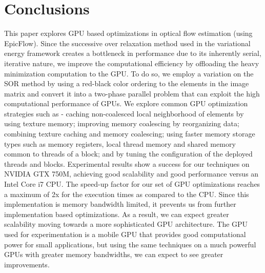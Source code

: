 \documentclass[english]{article}
\begin{document}
	\section{Conclusions}
	This paper explores GPU based optimizations in optical flow estimation (using EpicFlow). Since the successive over relaxation method used in the variational energy framework creates a bottleneck in performance due to its inherently serial, iterative nature, we improve the computational efficiency by offloading the heavy minimization computation to the GPU. To do so, we employ a variation on the SOR method by using a red-black color ordering to the elements in the image matrix and convert it into a two-phase parallel problem that can exploit the high computational performance of GPUs. We explore common GPU optimization strategies such as - caching non-coalesced local neighborhood of elements by using texture memory; improving memory coalescing by reorganizing data; combining texture caching and memory coalescing; using faster memory storage types such as memory registers, local thread memory and shared memory common to threads of a block; and by tuning the configuration of the deployed threads and blocks. Experimental results show a success for our techniques on NVIDIA GTX 750M, achieving good scalability and good performance versus an Intel Core i7 CPU. The speed-up factor for our set of GPU optimizations reaches a maximum of 2x for the execution times as compared to the CPU. Since this implementation is memory bandwidth limited, it prevents us from further implementation based optimizations. As a result, we can expect greater scalability moving towards a more sophisticated GPU architecture. The GPU used for experimentation is a mobile GPU that provides good computational power for small applications, but using the same techniques on a much powerful GPUs with greater memory bandwidths, we can expect to see greater improvements.

		
	

	
\end{document}
